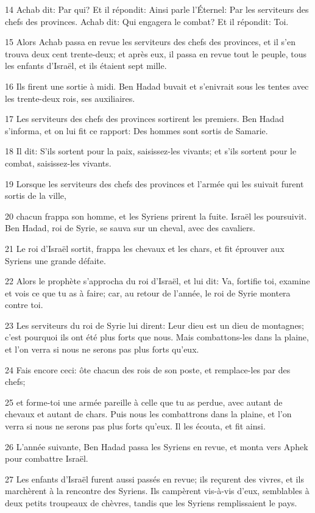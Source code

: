 \par 14 Achab dit: Par qui? Et il répondit: Ainsi parle l'Éternel: Par les serviteurs des chefs des provinces. Achab dit: Qui engagera le combat? Et il répondit: Toi.
\par 15 Alors Achab passa en revue les serviteurs des chefs des provinces, et il s'en trouva deux cent trente-deux; et après eux, il passa en revue tout le peuple, tous les enfants d'Israël, et ils étaient sept mille.
\par 16 Ils firent une sortie à midi. Ben Hadad buvait et s'enivrait sous les tentes avec les trente-deux rois, ses auxiliaires.
\par 17 Les serviteurs des chefs des provinces sortirent les premiers. Ben Hadad s'informa, et on lui fit ce rapport: Des hommes sont sortis de Samarie.
\par 18 Il dit: S'ils sortent pour la paix, saisissez-les vivants; et s'ils sortent pour le combat, saisissez-les vivants.
\par 19 Lorsque les serviteurs des chefs des provinces et l'armée qui les suivait furent sortis de la ville,
\par 20 chacun frappa son homme, et les Syriens prirent la fuite. Israël les poursuivit. Ben Hadad, roi de Syrie, se sauva sur un cheval, avec des cavaliers.
\par 21 Le roi d'Israël sortit, frappa les chevaux et les chars, et fit éprouver aux Syriens une grande défaite.
\par 22 Alors le prophète s'approcha du roi d'Israël, et lui dit: Va, fortifie toi, examine et vois ce que tu as à faire; car, au retour de l'année, le roi de Syrie montera contre toi.
\par 23 Les serviteurs du roi de Syrie lui dirent: Leur dieu est un dieu de montagnes; c'est pourquoi ils ont été plus forts que nous. Mais combattons-les dans la plaine, et l'on verra si nous ne serons pas plus forts qu'eux.
\par 24 Fais encore ceci: ôte chacun des rois de son poste, et remplace-les par des chefs;
\par 25 et forme-toi une armée pareille à celle que tu as perdue, avec autant de chevaux et autant de chars. Puis nous les combattrons dans la plaine, et l'on verra si nous ne serons pas plus forts qu'eux. Il les écouta, et fit ainsi.
\par 26 L'année suivante, Ben Hadad passa les Syriens en revue, et monta vers Aphek pour combattre Israël.
\par 27 Les enfants d'Israël furent aussi passés en revue; ils reçurent des vivres, et ils marchèrent à la rencontre des Syriens. Ils campèrent vis-à-vis d'eux, semblables à deux petits troupeaux de chèvres, tandis que les Syriens remplissaient le pays.
